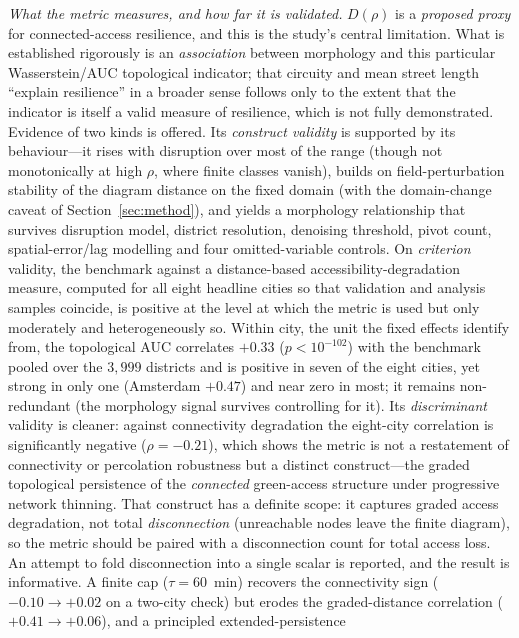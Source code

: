 \documentclass[sn-mathphys-num,pdflatex]{sn-jnl}
\newcommand{\Drho}{D(\rho)}
\begin{document}
\emph{What the metric measures, and how far it is validated.} $\Drho$ is a
\emph{proposed proxy} for connected-access resilience, and this is the study's central
limitation. What is established rigorously is an \emph{association} between morphology
and this particular Wasserstein/AUC topological indicator; that circuity and mean
street length ``explain resilience'' in a broader sense follows only to the extent
that the indicator is itself a valid measure of resilience, which is not fully
demonstrated. Evidence of two kinds is offered. Its
\emph{construct validity} is supported by its behaviour---it rises with disruption
over most of the range (though not monotonically at high $\rho$, where finite classes
vanish), builds on field-perturbation stability of the diagram distance on the fixed
domain \citep{cohensteiner2007stability} (with the domain-change caveat of
Section~\ref{sec:method}), and yields a morphology relationship that survives
disruption model, district resolution, denoising threshold, pivot count,
spatial-error/lag modelling and four omitted-variable controls. On \emph{criterion} validity, the benchmark against a
distance-based accessibility-degradation measure, computed for all eight headline
cities so that validation and analysis samples coincide, is positive at the level at
which the metric is used but only moderately and heterogeneously so. Within city, the
unit the fixed effects identify from, the topological AUC correlates $+0.33$
($p<10^{-102}$) with the benchmark pooled over the $3{,}999$ districts and is positive
in seven of the eight cities, yet strong in only one (Amsterdam $+0.47$) and near zero
in most; it remains non-redundant (the morphology signal survives controlling for it).
Its \emph{discriminant} validity is cleaner: against connectivity degradation the
eight-city correlation is significantly negative ($\rho=-0.21$), which shows the
metric is not a restatement of connectivity or percolation robustness but a distinct
construct---the graded topological persistence of the \emph{connected} green-access
structure under progressive network thinning. That construct has a definite scope: it
captures graded access degradation, not total \emph{disconnection} (unreachable nodes
leave the finite diagram), so the metric should be paired with a disconnection count
for total access loss. An attempt to fold disconnection into a
single scalar is reported, and the result is informative. A finite cap ($\tau=60$~min) recovers the
connectivity sign ($-0.10\to+0.02$ on a two-city check) but erodes the
graded-distance correlation ($+0.41\to+0.06$), and a principled extended-persistence
\end{document}
